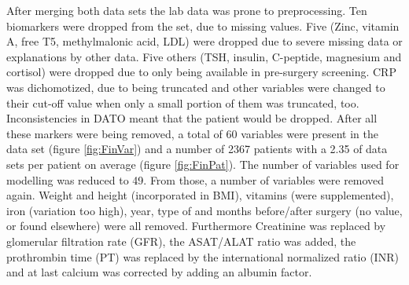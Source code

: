 \documentclass[10pt,a4paper]{report}
\begin{document}
	After merging both data sets the lab data was prone to preprocessing. Ten biomarkers were dropped from the set, due to missing values. Five (Zinc, vitamin A, free T5, methylmalonic acid, LDL) were dropped due to severe missing data or explanations by other data. Five others (TSH, insulin, C-peptide, magnesium and cortisol) were dropped due to only being available in pre-surgery screening. CRP was dichomotized, due to being truncated and other variables were changed to their cut-off value when only a small portion of them was truncated, too. Inconsistencies in DATO meant that the patient would be dropped. After all these markers were being removed, a total of 60 variables were present in the data set (figure \ref{fig:FinVar}) and a number of 2367 patients with a 2.35 of data sets per patient on average (figure \ref{fig:FinPat}). The number of variables used for modelling was reduced to 49. From those, a number of variables were removed again. Weight and height (incorporated in BMI), vitamins (were supplemented), iron (variation too high), year, type of and months before/after surgery (no value, or found elsewhere) were all removed. Furthermore Creatinine was replaced by glomerular filtration rate (GFR), the ASAT/ALAT ratio was added, the prothrombin time (PT) was replaced by the international normalized ratio (INR) and at last calcium was corrected by adding an albumin factor. 
	
\end{document}
